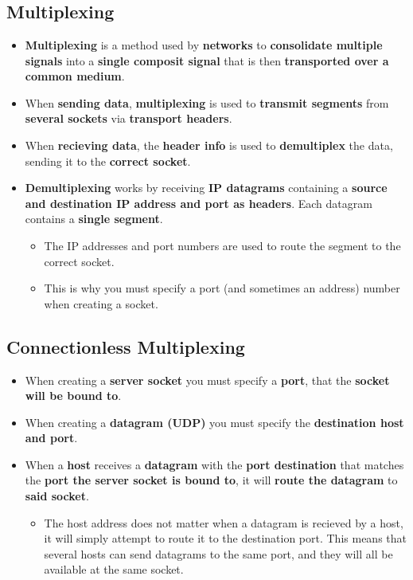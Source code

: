 \documentclass[16pt]{article}
\begin{document}
    \section*{}
    
    \subsection*{Multiplexing}
    \begin{itemize}
        \item \textbf{Multiplexing} is a method used by \textbf{networks} to \textbf{consolidate multiple signals} into a \textbf{single composit signal} that is then \textbf{transported over a common medium}. 
        \item When \textbf{sending data}, \textbf{multiplexing} is used to \textbf{transmit segments} from \textbf{several sockets} via \textbf{transport headers}.
        \item When \textbf{recieving data}, the \textbf{header info} is used to \textbf{demultiplex} the data, sending it to the \textbf{correct socket}.
        \item \textbf{Demultiplexing} works by receiving \textbf{IP datagrams} containing a \textbf{source and destination IP address and port as headers}. Each datagram contains a \textbf{single segment}.
        \begin{itemize}
            \item The IP addresses and port numbers are used to route the segment to the correct socket.
            \item This is why you must specify a port (and sometimes an address) number when creating a socket.
        \end{itemize} 
    \end{itemize}

    \subsection*{Connectionless Multiplexing}
    \begin{itemize}
        \item When creating a \textbf{server socket} you must specify a \textbf{port}, that the \textbf{socket will be bound to}.
        \item When creating a \textbf{datagram (UDP)} you must specify the \textbf{destination host and port}.
        \item When a \textbf{host} receives a \textbf{datagram} with the \textbf{port destination} that matches the \textbf{port the server socket is bound to}, it will \textbf{route the datagram} to \textbf{said socket}.
        \begin{itemize}
            \item The host address does not matter when a datagram is recieved by a host, it will simply attempt to route it to the destination port. This means that several hosts can send datagrams to the same port, and they will all be available at the same socket.
        \end{itemize}  
    \end{itemize}
\end{document}
